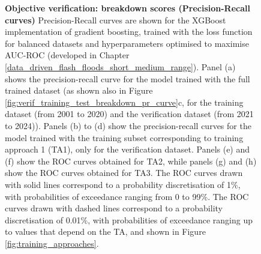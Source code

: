 \begin{figure}[htbp]
\caption{\textbf{Objective verification: breakdown scores (Precision-Recall curves)} Precision-Recall curves are shown for the XGBoost implementation of gradient boosting, trained with the loss function for balanced datasets and hyperparameters optimised to maximise AUC-ROC (developed in Chapter \ref{data_driven_flash_floods_short_medium_range}). Panel (a) shows the precision-recall curve for the model trained with the full trained dataset (as shown also in Figure \ref{fig:verif_training_test_breakdown_pr_curve}c, for the \textcolor{colourTraining}{training} dataset (from 2001 to 2020) and the \textcolor{colourTest}{verification} dataset (from 2021 to 2024)). Panels (b) to (d) show the precision-recall curves for the model trained with the training subset corresponding to training approach 1 (TA1), only for the \textcolor{colourTest}{verification} dataset. Panels (e) and (f) show the ROC curves obtained for TA2, while panels (g) and (h) show the ROC curves obtained for TA3. The ROC curves drawn with solid lines correspond to a probability discretisation of 1\%, with probabilities of exceedance ranging from 0 to 99\%. The ROC curves drawn with dashed lines correspond to a probability discretisation of 0.01\%, with probabilities of exceedance ranging up to values that depend on the TA, and shown in Figure \ref{fig:training_approaches}.}
\label{fig:verif_breakdown_scores_pr_curve}
\end{figure}


